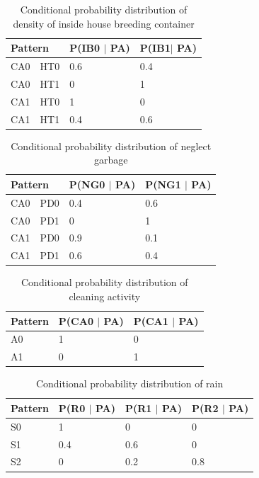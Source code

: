 \documentclass[review]{elsarticle}
\begin{document}
	\begin{table}[!htbp]
		\centering
		\normalsize
		\begin{tabular}{|l|l|l|l|}
			\hline
			\multicolumn{2}{|l|}{Pattern}  & P(IB0 $\mid$ PA) & P(IB1$\mid$ PA)\\
			\hline
			CA0 & HT0 & 0.6 & 0.4\\
			\hline
			CA0 & HT1 & 0 & 1\\
			\hline
			CA1 & HT0 & 1 & 0\\
			\hline
			CA1 & HT1 & 0.4 & 0.6\\
			\hline
		\end{tabular}
		\caption{Conditional probability distribution of density of inside house breeding container}
	\end{table}
	
	\begin{table}[!htbp]
		\centering
		\normalsize
		\begin{tabular}{|l|l|l|l|}
			\hline
			\multicolumn{2}{|l|}{Pattern}  & P(NG0 $\mid$ PA) & P(NG1 $\mid$ PA)\\
			\hline
			CA0 & PD0 & 0.4 & 0.6\\
			\hline
			CA0 & PD1 & 0 & 1\\
			\hline
			CA1 & PD0 & 0.9 & 0.1\\
			\hline
			CA1 & PD1 & 0.6 & 0.4\\
			\hline
		\end{tabular}
		\caption{Conditional probability distribution of neglect garbage}
	\end{table}
	
	\begin{table}[!htbp]
		\centering
		\normalsize
		\begin{tabular}{|l|l|l|}
			\hline
			Pattern & P(CA0 $\mid$ PA) & P(CA1 $\mid$ PA)\\
			\hline
			A0 & 1 & 0\\
			\hline
			A1 & 0 & 1\\
			\hline
		\end{tabular}
		\caption{Conditional probability distribution of cleaning activity}
	\end{table}
	
	
	\begin{table}[!htbp]
		\centering
		\normalsize
		\begin{tabular}{|l|l|l|l|}
			\hline
			Pattern & P(R0 $\mid$ PA) & P(R1 $\mid$ PA) & P(R2 $\mid$ PA)\\
			\hline
			S0 & 1 & 0 & 0\\
			\hline
			S1 & 0.4 & 0.6 & 0\\
			\hline
			S2 & 0 & 0.2 & 0.8\\
			\hline
		\end{tabular}
		\caption{Conditional probability distribution of rain}
	\end{table}
	
\end{document}
